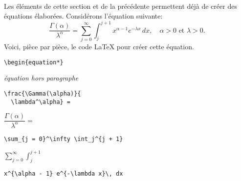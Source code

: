 \begin{exemple}
  Les éléments de cette section et de la précédente permettent déjà de
  créer des équations élaborées. Considérons l'équation suivante:
  \begin{equation*}
    \frac{\Gamma(\alpha)}{\lambda^\alpha} =
    \sum_{j = 0}^\infty \int_j^{j + 1} x^{\alpha - 1} e^{-\lambda x}\,
    dx,
    \quad
    \alpha > 0 \text{ et } \lambda > 0.
  \end{equation*}
  Voici, pièce par pièce, le code {\LaTeX} pour créer cette équation.
  \begin{demo}
  \item
    \begin{texinput}{0.58\linewidth}
\begin{lstlisting}
\begin{equation*}
\end{lstlisting}
    \end{texinput}
    \hfill
    \begin{texoutput}{0.38\linewidth}
      \emph{équation hors paragraphe}
    \end{texoutput}
  \item
    \begin{texinput}{0.58\linewidth}
\begin{lstlisting}
\frac{\Gamma(\alpha)}{
  \lambda^\alpha} =
\end{lstlisting}
    \end{texinput}
    \hfill
    \begin{texoutput}{0.38\linewidth}
      $\dfrac{\Gamma(\alpha)}{\lambda^\alpha} =$
    \end{texoutput}
  \item
    \begin{texinput}{0.58\linewidth}
\begin{lstlisting}
\sum_{j = 0}^\infty \int_j^{j + 1}
\end{lstlisting}
    \end{texinput}
    \hfill
    \begin{texoutput}{0.38\linewidth}
      $\displaystyle \sum_{j = 0}^\infty \int_j^{j + 1}$
    \end{texoutput}
  \item
    \begin{texinput}{0.58\linewidth}
\begin{lstlisting}
x^{\alpha - 1} e^{-\lambda x}\, dx
\end{lstlisting}
    \end{texinput}
    \hfill
    \begin{texoutput}{0.38\linewidth}

\end{texoutput}
\end{demo}
\end{exemple}
